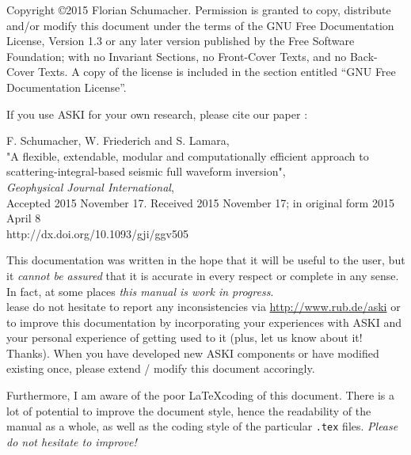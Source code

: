 \documentclass[12pt,a4paper]{book}
\newcommand{\lcode}[1]{\nolinkurl{#1}}
\newcommand{\ASKI}{ {\ttfamily ASKI} }
\begin{document}
%
\setlength{\parindent}{0em}
\setlength{\parskip}{0.5em}
%
%

%
Copyright \copyright 2015 Florian Schumacher.
Permission is granted to copy, distribute and/or modify this document
under the terms of the GNU Free Documentation License, Version 1.3
or any later version published by the Free Software Foundation;
with no Invariant Sections, no Front-Cover Texts, and no Back-Cover Texts.
A copy of the license is included in the section entitled ``GNU
Free Documentation License''.

\vspace{1cm}

If you use \ASKI for your own research, please cite our paper \cite{Schumacher16}:

F. Schumacher, W. Friederich and S. Lamara, \\
"A flexible, extendable, modular and 
computationally efficient approach to scattering-integral-based seismic full waveform 
inversion", \\
\emph{Geophysical Journal International}, \\
Accepted 2015 November 17.  Received 2015 November 17; in original form 2015 April 8\\
http://dx.doi.org/10.1093/gji/ggv505

\vspace{1em}

This documentation was written in the hope that it will be useful to the user,
but it \emph{cannot be assured} that it is accurate in every respect or complete in any sense.
In fact, at some places \emph{this manual is work in progress}.\\
lease do not hesitate to report any inconsistencies via \url{http://www.rub.de/aski} or
to improve this documentation by incorporating your experiences with \ASKI 
and your personal experience of getting used to it (plus, let us know about it! Thanks). 
When you have developed new \ASKI components or 
have modified existing once, please extend / modify this document accoringly.

Furthermore, I am aware of the poor \LaTeX coding of this document. There is a lot of potential
to improve the document 
style, hence the readability of the manual as a whole, as well as the coding style of the 
particular \lcode{.tex} files. \emph{Please do not hesitate to improve!}
\end{document}
